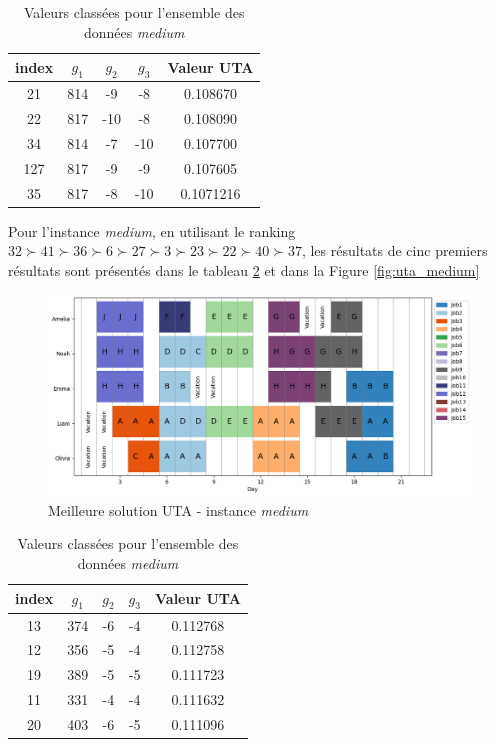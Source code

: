 \documentclass[12pt, a4paper, french, version=last, parskip=half, titlepage]{scrartcl}
\begin{document}
\begin{table}
\centering
\begin{tabular}{c c c c c}
    \toprule
     index & $g_1$ & $g_2$ & $g_3$ & Valeur UTA \\
     \midrule
    21 & 814 & -9 & -8 & 0.108670 \\
    22 & 817 & -10 & -8 & 0.108090 \\
    34 & 814 & -7 & -10 & 0.107700 \\
    127 & 817 & -9 & -9 & 0.107605 \\
    35 & 817 & -8 & -10 & 0.1071216 \\
    \bottomrule
\end{tabular}
\caption{Valeurs classées pour l'ensemble des données \emph{medium}}
\label{tab:uta_medium}
\end{table}


Pour l'instance \emph{medium}, en utilisant le ranking $32 \succ 41 \succ 36 \succ 6 \succ 27 \succ 3 \succ 23 \succ 22 \succ 40 \succ 37$, les résultats de cinc premiers résultats sont présentés dans le tableau \ref{tab:uta_medium} et dans la Figure \ref{fig:uta_medium}


\begin{figure}[h]
\centering
\includegraphics[width=1\textwidth]{images/best_uta_medium.png}
\caption{Meilleure solution UTA - instance \emph{medium}}
\label{fig:uta_medium_best}
\end{figure}    

\begin{table}
\centering
\begin{tabular}{c c c c c}
    \toprule
     index & $g_1$ & $g_2$ & $g_3$ & Valeur UTA \\
     \midrule
    13 & 374 & -6 & -4 & 0.112768 \\
    12 & 356 & -5 & -4 & 0.112758 \\
    19 & 389 & -5 & -5 & 0.111723 \\
    11 & 331 & -4 & -4 & 0.111632 \\
    20 & 403 & -6 & -5 & 0.111096 \\
    \bottomrule
\end{tabular}
\caption{Valeurs classées pour l'ensemble des données \emph{medium}}
\label{tab:uta_medium}
\end{table}
\end{document}
